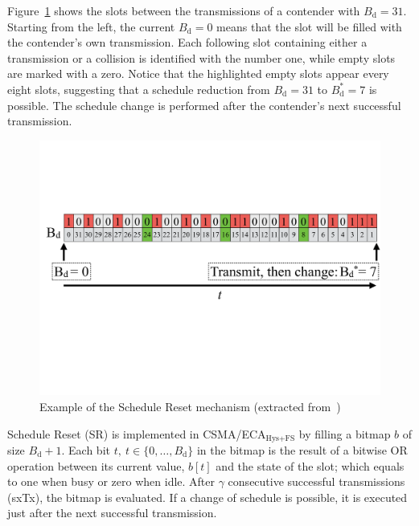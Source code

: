 Figure~\ref{fig:scheduleReset1} shows the slots between the transmissions of a contender with $B_{\text{d}}=31$. Starting from the left, the current $B_{\text{d}}=0$ means that the slot will be filled with the contender's own transmission. Each following slot containing either a transmission or a collision is identified with the number one, while empty slots are marked with a zero. Notice that the highlighted empty slots appear every eight slots, suggesting that a schedule reduction from $B_{\text{d}}=31$ to $B_{\text{d}}^{*}=7$ is possible. The schedule change is performed after the contender's next successful transmission. 



	\begin{figure}[t!]
	\centering
		\includegraphics[width=0.7\linewidth]{figures/scheduleReset.pdf}
		\caption{Example of the Schedule Reset mechanism (extracted from~\cite{sanabria2014high})}
		\label{fig:scheduleReset1}
	\end{figure}

Schedule Reset (SR) is implemented in CSMA/ECA$_{\text{Hys+FS}}$ by filling a bitmap $b$ of size $B_{\text{d}}+1$. Each bit $t,~t\in\{0,\ldots ,B_{\text{d}}\}$ in the bitmap is the result of a bitwise OR operation between its current value, $b[t]$ and the state of the slot; which equals to one when busy or zero when idle. After $\gamma$ consecutive successful transmissions (sxTx), the bitmap is evaluated. If a change of schedule is possible, it is executed just after the next successful transmission.

